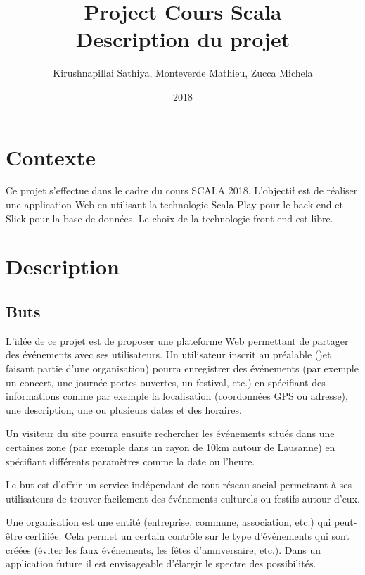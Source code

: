 \documentclass[11pt, a4paper, french, twoside]{article}
\title{Project Cours Scala \\ Description du projet}
\author{Kirushnapillai Sathiya, Monteverde Mathieu, Zucca Michela}
\date{2018}
\begin{document}
	\graphicspath{ {images/} }
	
	\newcommand{\HRule}{\rule{\linewidth}{0.5mm}}
	
	
	
	\setcounter{page}{1}
	\newpage
	
	\setlength{\parskip}{0.2cm}
	
	\section{Contexte}
	\label{sec:contexte}
		Ce projet s'effectue dans le cadre du cours SCALA 2018. L'objectif est de réaliser une application Web en utilisant la technologie Scala Play pour le back-end et Slick pour la base de données. Le choix de la technologie front-end est libre.
		
	\section{Description}
	\label{sec:description}
	
		\subsection{Buts}
		\label{subsec:buts}
		L'idée de ce projet est de proposer une plateforme Web permettant de partager des événements avec ses utilisateurs. Un utilisateur inscrit au préalable ()et faisant partie d'une organisation) pourra enregistrer des événements (par exemple un concert, une journée portes-ouvertes, un festival, etc.) en spécifiant des informations comme par exemple la localisation (coordonnées GPS ou adresse), une description, une ou plusieurs dates et des horaires.
		
		Un visiteur du site pourra ensuite rechercher les événements situés dans une certaines zone (par exemple dans un rayon de 10km autour de Lausanne) en spécifiant différents paramètres comme la date ou l'heure. 
		
		Le but est d'offrir un service indépendant de tout réseau social permettant à ses utilisateurs de trouver facilement des événements culturels ou festifs autour d'eux. 
		
		Une organisation est une entité (entreprise, commune, association, etc.) qui peut-être certifiée. Cela permet un certain contrôle sur le type d'événements qui sont créées (éviter les faux événements, les fêtes d'anniversaire, etc.). Dans un application future il est envisageable d'élargir le spectre des possibilités.
		
\end{document}
